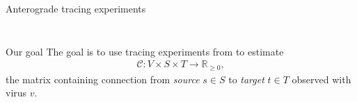\documentclass{beamer}
\begin{document}
\begin{frame}{Anterograde tracing experiments}
\begin{columns}
\begin{column}{0.9\textwidth}
\begin{figure}[H]
    \newline
    \label{fig:data}
\end{figure}
\end{column}
\end{columns}
\end{frame}

\begin{frame}{Our goal}
The goal is to use tracing experiments from \citeauthor{Harris2019-mr} to estimate 
\begin{eqnarray*}
\mathcal C: V \times S \times T \to \mathbb R_{\geq 0},
\end{eqnarray*}
the matrix containing connection from \textit{source} $s \in S$ to \textit{target} $t \in T$ observed with virus  $v$.
\end{frame}
\end{document}
